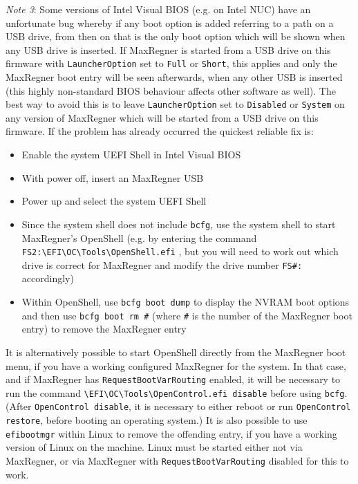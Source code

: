 \documentclass[]{article}
\providecommand{\tightlist}{%
  \setlength{\itemsep}{0pt}\setlength{\parskip}{0pt}}
\begin{document}
\begin{enumerate}
  \emph{Note 3}: Some versions of Intel Visual BIOS (e.g. on Intel NUC) have an unfortunate bug whereby if any boot
  option is added referring to a path on a USB drive, from then on that is the only boot option which will be shown
  when any USB drive is inserted. If MaxRegner is started from a USB drive on this firmware with
  \texttt{LauncherOption} set to \texttt{Full} or \texttt{Short}, this applies and only the MaxRegner boot entry will be
  seen afterwards, when any other USB is inserted (this highly non-standard BIOS behaviour affects other software as well).
  The best way to avoid this is to leave \texttt{LauncherOption} set to \texttt{Disabled} or \texttt{System} on any
  version of MaxRegner which will be started from a USB drive on this firmware. If the problem has already
  occurred the quickest reliable fix is:
  \begin{itemize}
  \tightlist
    \item Enable the system UEFI Shell in Intel Visual BIOS
    \item With power off, insert an MaxRegner USB
    \item Power up and select the system UEFI Shell
    \item Since the system shell does not include \texttt{bcfg}, use the system shell to start MaxRegner's OpenShell
    (e.g. by entering the command \texttt{FS2:\textbackslash EFI\textbackslash OC\textbackslash Tools\textbackslash OpenShell.efi} ,
    but you will need to work out which drive is correct for MaxRegner and modify the drive number \texttt{FS\#:} accordingly)
    \item Within OpenShell, use \texttt{bcfg boot dump} to display the NVRAM boot options and then use \texttt{bcfg boot rm \#}
    (where \texttt{\#} is the number of the MaxRegner boot entry) to remove the MaxRegner entry
  \end{itemize}
  It is alternatively possible to start OpenShell directly from the MaxRegner boot menu, if you have
  a working configured MaxRegner for the system. In that case, and if MaxRegner has \texttt{RequestBootVarRouting} enabled, it will be
  necessary to run the command \texttt{\textbackslash EFI\textbackslash OC\textbackslash Tools\textbackslash OpenControl.efi disable}
  before using \texttt{bcfg}. (After \texttt{OpenControl disable}, it is necessary to either reboot or run \texttt{OpenControl restore},
  before booting an operating system.)
  It is also possible to use \texttt{efibootmgr} within Linux to remove the offending entry, if you have a working
  version of Linux on the machine. Linux must be started either not via MaxRegner, or via MaxRegner with \texttt{RequestBootVarRouting} disabled
  for this to work.


\end{enumerate}
\end{document}
